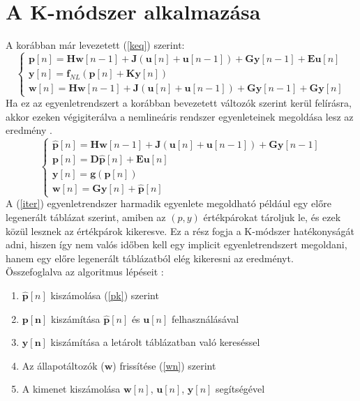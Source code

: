 \section{A K-módszer alkalmazása}
A korábban már levezetett (\ref{keq}) szerint:
\begin{equation}
    \begin{cases}
        \mathbf{p}[n]=\mathbf{Hw}[n-1]+\mathbf{J}(\mathbf{u}[n]+\mathbf{u}[n-1])+\mathbf{G}\mathbf{y}[n-1]+\mathbf{Eu}[n] \\
        \mathbf{y}[n]=\mathbf{f}_{NL}(\mathbf{p}[n]+\mathbf{Ky}[n]) \\
        \mathbf{w}[n]=\mathbf{Hw}[n-1]+\mathbf{J}(\mathbf{u}[n]+\mathbf{u}[n-1])+\mathbf{Gy}[n-1]+\mathbf{Gy}[n]
    \end{cases}
\end{equation}
Ha ez az egyenletrendszert a korábban bevezetett változók szerint kerül felírásra, akkor ezeken 
végigiterálva a nemlineáris rendszer egyenleteinek megoldása lesz az eredmény \cite{borin}.
\begin{equation}
    \begin{cases}
        \mathbf{\hat{p}}[n]=\mathbf{Hw}[n-1]+\mathbf{J}(\mathbf{u}[n]+\mathbf{u}[n-1])+\mathbf{Gy}[n-1] \\
        \mathbf{p}[n]=\mathbf{D\hat{p}}[n]+\mathbf{Eu}[n] \\
        \mathbf{y}[n]=\mathbf{g}(\mathbf{p}[n]) \\
        \mathbf{w}[n]=\mathbf{Gy}[n]+\mathbf{\hat{p}}[n]
    \end{cases}
    \label{iter}
\end{equation}
A (\ref{iter}) egyenletrendszer harmadik egyenlete megoldható például egy előre legenerált 
táblázat szerint, amiben az $(p,y)$ értékpárokat tároljuk le, és ezek közül lesznek az értékpárok kikeresve. 
Ez a rész fogja a K-módszer hatékonyságát adni, hiszen így nem valós időben kell egy 
implicit egyenletrendszert megoldani, hanem egy előre legenerált táblázatból elég kikeresni 
az eredményt.\\
Összefoglalva az algoritmus lépéseit \cite{otherK}:
\begin{enumerate}
    \item $\mathbf{\hat{p}}[n]$ kiszámolása (\ref{pk}) szerint
    \item $\mathbf{p[n]}$ kiszámítása $\mathbf{\hat{p}}[n]$ és $\mathbf{u}[n]$ felhasználásával
    \item $\mathbf{y[n]}$ kiszámítása a letárolt táblázatban való kereséssel
    \item Az állapotáltozók ($\mathbf{w}$) frissítése (\ref{wn}) szerint
    \item A kimenet kiszámolása $\mathbf{w}[n]$, $\mathbf{u}[n]$, $\mathbf{y}[n]$ segítségével
\end{enumerate}

